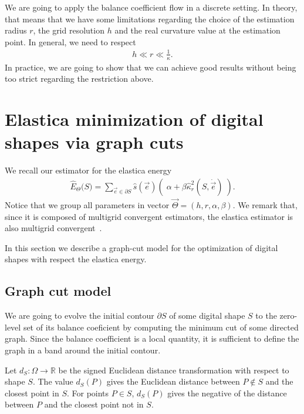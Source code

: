 \documentclass[smallextended]{svjour3}
\begin{document}
We are going to apply the balance coefficient flow in a discrete setting. In theory, that means that we have some limitations regarding the choice of the estimation radius $r$, the grid resolution $h$ and the real curvature value at the estimation point. In general, we need to respect
%
%
\begin{align*}
	h \ll r \ll \frac{1}{\kappa}.
\end{align*}
%
%
In practice, we are going to show that we can achieve good results without being too strict regarding the restriction above.
%
%
\section{Elastica minimization of digital shapes via graph cuts}
We recall our estimator for the elastica energy 
%
\begin{align}
	\hat{E}_{\Theta}\big( S \big) = \sum_{\vec{e} \in \partial S}{ \hat{s}(\vec{e})\left(\; \alpha + \beta \hat{\kappa}_{r}^2(S,\dot{\vec{e}}) \; \right)}.
	\label{eq:elastica-estimator-2}
\end{align}
%
%
Notice that we group all parameters in vector $\vec{\Theta}=(h,r,\alpha,\beta)$. We remark that, since it is composed of multigrid convergent estimators, the elastica estimator is also multigrid convergent~\cite{lachaud06hdr}.

In this section we describe a graph-cut model for the optimization of digital shapes with respect the elastica energy.

 
\subsection{Graph cut model}\label{sec:graph-cut-model}

We are going to evolve the initial contour $\partial S$ of some digital shape $S$ to the zero-level set of its balance coeficient by computing the minimum cut of some directed graph. Since the balance coefficient is a local quantity, it is sufficient to define the graph in a band around the initial contour.

Let $d_{S}:\Omega \rightarrow \mathbb{R}$ be the signed Euclidean distance transformation with respect to shape $S$. The value $d_{S}(P)$ gives the Euclidean distance between $P \notin S$ and the closest point in $S$. For points $P \in S$, $d_{S}(P)$ gives the negative of the distance between $P$ and the closest point not in $S$.
\end{document}
